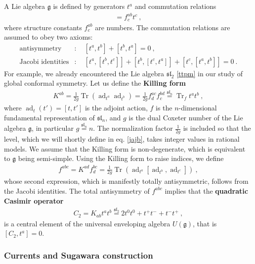 \documentclass[12pt, a4paper, notitlepage, twoside]{report}
\numberwithin{equation}{section}
\theoremstyle{break}
\begin{document}
A Lie algebra $\mathfrak{g}$ is defined by generators $t^a$ and commutation relations 
\begin{align}
 [t^a,t^b] = f^{ab}_c t^c \ ,
\label{ttft}
\end{align}
where structure constants $f^{ab}_c$ are numbers.
The commutation relations are assumed to obey two axioms:
\begin{align}
 \text{antisymmetry} & : \quad [t^a,t^b] + [t^b,t^a] = 0\ ,
\\
\text{Jacobi identities} & : \quad  [t^a,[t^b,t^c]] + [t^b,[t^c,t^a]] + [t^c,[t^a,t^b]] = 0 \ .
\end{align}
For example, we already encountered the Lie algebra $\mathfrak{sl}_2$ \eqref{ttpm} in our study of global conformal symmetry.
Let us define the \textbf{\boldmath Killing form} 
\begin{align}
 K^{ab} = \frac{1}{2g} \operatorname{Tr} \left(\operatorname{ad}_{t^a}\operatorname{ad}_{t^b}\right) =\frac{1}{2g} f^{ac}_d f^{bd}_c \overset{\mathfrak{sl}_n}{=}\operatorname{Tr}_f t^at^b\ ,
\end{align}
where  $\operatorname{ad}_t(t') = [t,t']$ is the adjoint action, $f$ is the $n$-dimensional fundamental representation of $\mathfrak{sl}_n$, and $g$ is the dual Coxeter number of the Lie algebra $\mathfrak{g}$, in particular $g\overset{\mathfrak{sl}_n}{=}n$.
The normalization factor $\frac{1}{2g}$ is included so that the level, which we will shortly define in eq. \eqref{jajb}, takes integer values in rational models.
We assume that the Killing form is non-degenerate, which is equivalent to $\mathfrak{g}$ being semi-simple. 
Using the Killing form to raise indices, we define
\begin{align}
 f^{abc} = K^{ad}f_d^{bc} = \frac{1}{2g}\operatorname{Tr}\left( \operatorname{ad}_{t^a} [\operatorname{ad}_{t^b}, \operatorname{ad}_{t^c}] \right)\ ,
\end{align}
whose second expression, which is manifestly totally antisymmetric, follows from the Jacobi identities.
The total antisymmetry of $f^{abc}$ implies that the \textbf{\boldmath quadratic Casimir operator}
\begin{align}
 C_2 = K_{ab} t^a t^b \overset{\mathfrak{sl}_2}{=} 2t^0t^0+ t^+t^-+t^-t^+\ ,
\label{ctk}
\end{align}
is a central element of the universal enveloping algebra $U(\mathfrak{g})$, that is $[C_2,t^a]=0$.

\subsubsection{Currents and Sugawara construction}
\end{document}
